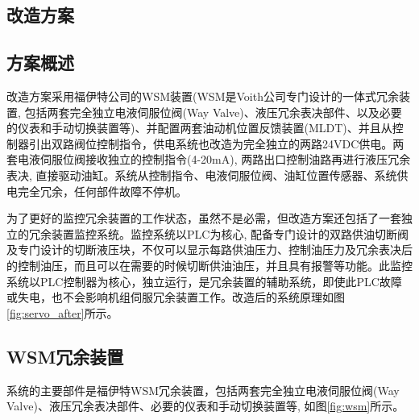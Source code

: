\documentclass[UTF8,a1paper,twoside,11pt]{article}
\begin{document}
{\begin{multicols}{2}
\section*{改造方案}
\subsection*{方案概述}
改造方案采用福伊特公司的WSM装置(WSM是Voith公司专门设计的一体式冗余装置, 包括两套完全独立电液伺服位阀(Way Valve)、液压冗余表决部件、以及必要的仪表和手动切换装置等)、并配置两套油动机位置反馈装置(MLDT)、并且从控制器引出双路阀位控制指令，供电系统也改造为完全独立的两路24VDC供电。两套电液伺服位阀接收独立的控制指令(4-20mA), 两路出口控制油路再进行液压冗余表决, 直接驱动油缸。系统从控制指令、电液伺服位阀、油缸位置传感器、系统供电完全冗余，任何部件故障不停机。\par
为了更好的监控冗余装置的工作状态，虽然不是必需，但改造方案还包括了一套独立的冗余装置监控系统。监控系统以PLC为核心, 配备专门设计的双路供油切断阀及专门设计的切断液压块，不仅可以显示每路供油压力、控制油压力及冗余表决后的控制油压，而且可以在需要的时候切断供油油压，并且具有报警等功能。此监控系统以PLC控制器为核心，独立运行，是冗余装置的辅助系统，即使此PLC故障或失电，也不会影响机组伺服冗余装置工作。改造后的系统原理如图\ref{fig:servo_after}所示。\par

\subsection*{WSM冗余装置}
系统的主要部件是福伊特WSM冗余装置，包括两套完全独立电液伺服位阀(Way Valve)、液压冗余表决部件、必要的仪表和手动切换装置等, 如图\ref{fig:wsm}所示。\par
\end{multicols}

\newpage
{}
\headfootnormalbody
{}

\begin{figure}[H]
\begin{center}
\begin{tikzpicture}[ >=stealth, very thick]


\end{tikzpicture}
\end{center}
\end{figure}}
\end{document}
